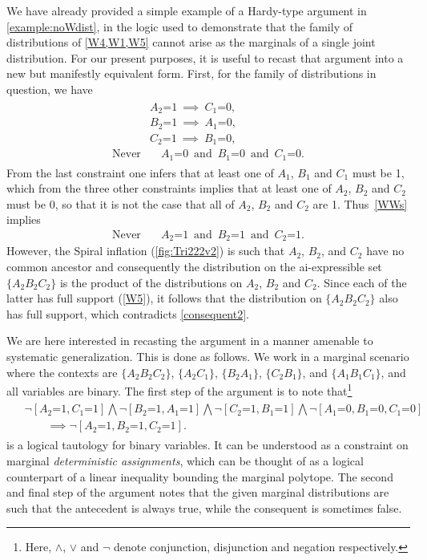 \documentclass[aps,english,10pt,superscriptaddress,onecolumn,twoside,longbibliography,pra,floatfix,fleqn,nofootinbib]{revtex4-1}
\theoremstyle{definition}
\newcounter{example}[section]
\newcommand{\eql}{\mathord{=}}
\begin{document}
We have already provided a simple example of a Hardy-type argument in \cref{example:noWdist}, in the logic used to demonstrate that the family of distributions of \cref{W4,W1,W5} cannot arise as the marginals of a single joint distribution. For our present purposes, it is useful to recast that argument into a new but manifestly equivalent form. First, for the family of distributions in question, we have
\begin{align} 
\begin{split}\label{WWs}
&A_2 \eql 1 \:\implies\: C_1 \eql 0,\\
&B_2 \eql 1 \:\implies\: A_1 \eql 0,\\
&C_2  \eql 1 \:\implies\: B_1  \eql 0,\\
\text{Never}  &\quad A_1 \eql 0\,\text{ and }\, B_1 \eql 0\,\text{ and }\, C_1  \eql 0.
\end{split}
\end{align}
From the last constraint one infers that at least one of $A_1$, $B_1$ and $C_1$ must be 1, which from the three other constraints implies that at least one of $A_2$, $B_2$ and $C_2$ must be 0, so that it is not the case that all of $A_2$, $B_2$ and $C_2$ are 1.  Thus~\cref{WWs} implies
\begin{align} \label{consequent2}
\text{Never}  \quad &A_2  \eql 1\,\text{ and }\, B_2  \eql 1\,\text{ and }\, C_2  \eql 1.
\end{align}
However, the Spiral inflation (\cref{fig:Tri222v2}) is such that $A_2$, $B_2$, and $C_2$ have no common ancestor and consequently the distribution on the ai-expressible set $\{A_2 B_2 C_2\}$ is the product of the distributions on $A_2$, $B_2$ and $C_2$.  Since each of the latter has full support (\cref{W5}), it follows that the distribution on $\{A_2 B_2 C_2\}$ also has full support, which contradicts \cref{consequent2}.

We are here interested in recasting the argument in a manner amenable to systematic generalization. This is done as follows. We work in a marginal scenario where the contexts are $\{A_2 B_2 C_2\}$, $\{A_2 C_1\}$, $\{B_2 A_1\}$, $\{C_2 B_1\}$, and  $\{A_1 B_1 C_1\}$, and all variables are binary. The first step of the argument is to note that\footnote{Here, $\land$, $\lor$ and $\lnot$ denote conjunction, disjunction and negation respectively.}
\begin{align}\begin{split}\label{tautology1}
&\lnot [A_2 \eql 1, C_1 \eql 1] \bigwedge \lnot [B_2 \eql 1, A_1 \eql 1] \bigwedge \lnot [C_2 \eql 1, B_1 \eql 1] \bigwedge \lnot [A_1 \eql 0, B_1 \eql 0, C_1 \eql 0]\\
 &\qquad\implies
\lnot [A_2 \eql 1, B_2 \eql 1, C_2 \eql 1].
\end{split}\end{align}
is a logical tautology for binary variables. It can be understood as a constraint on marginal {\em deterministic assignments}, which can be thought of as a logical counterpart of a linear inequality bounding the marginal polytope. The second and final step of the argument notes that the given marginal distributions are such that the antecedent is always true, while the consequent is sometimes false.
\end{document}
